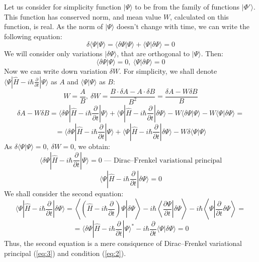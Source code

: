 \documentclass[a4paper,14pt]{extarticle}
\begin{document}
Let us consider for simplicity function $|\Psi\rangle$ to be from the family of functions $|\Phi'\rangle$. 
This function has conserved norm, and mean value $W$, calculated on this function, is real.
As the norm of $|\Psi\rangle$ doesn't change with time, we can write the following equation:
$$\delta\langle\Psi|\Psi\rangle = \langle\delta\Psi|\Psi\rangle+\langle\Psi|\delta\Psi\rangle=0$$
We will consider only variations $|\delta\Psi\rangle$, that are orthogonal to $|\Psi\rangle$. Then:
\begin{equation}
\langle\delta\Psi|\Psi\rangle=0,\ \langle\Psi|\delta\Psi\rangle=0
\label{eq:2}
\end{equation}
Now we can write down variation $\delta W$. 
For simplicity, we shall denote $\langle\Psi|\hat{H}-i\hbar\frac{\partial}{\partial t}|\Psi\rangle$ as $A$ 
and $\langle\Psi|\Psi\rangle$ as $B$:
$$W = \frac{A}{B},\ \delta W = \frac{B\cdot\delta A - A\cdot\delta B}{B^2}=\frac{\delta A - W\delta B}{B}$$
$$\delta A - W\delta B = \langle\delta\Psi|\hat{H}-i\hbar\frac{\partial}{\partial t}|\Psi\rangle + %
			 \langle\Psi|\hat{H}-i\hbar\frac{\partial}{\partial t}|\delta\Psi\rangle - 
			 W\langle\delta\Psi|\Psi\rangle - W\langle\Psi|\delta\Psi\rangle = $$
$$ = \langle\delta\Psi|\hat{H}-i\hbar\frac{\partial}{\partial t}|\Psi\rangle + %
     \langle\Psi|\hat{H}-i\hbar\frac{\partial}{\partial t}|\delta\Psi\rangle - W\delta\langle\Psi|\Psi\rangle$$
As $\delta\langle\Psi|\Psi\rangle=0,\ \delta W = 0$, we obtain:
\begin{equation}
\langle\delta\Psi|\hat{H}-i\hbar\frac{\partial}{\partial t}|\Psi\rangle = 0\text{ --- Dirac--Frenkel variational principal}
\label{eq:3}
\end{equation}
$$\langle\Psi|\hat{H}-i\hbar\frac{\partial}{\partial t}|\delta\Psi\rangle = 0$$
We shall consider the second equation:
$$\langle\Psi|\hat{H}-i\hbar\frac{\partial}{\partial t}|\delta\Psi\rangle = %
  \left\langle\left.\left(\hat{H}-i\hbar\frac{\partial}{\partial t}\right)\Psi\right|\delta\Psi\right\rangle-%
  i\hbar\left.\left\langle\frac{\partial\Psi}{\partial t}\right|\delta\Psi\right\rangle-%
  i\hbar\left\langle\Psi\left|\frac{\partial}{\partial t}\delta\Psi\right\rangle\right.=$$
$$=\langle\delta\Psi|\hat{H}-i\hbar\frac{\partial}{\partial t}|\Psi\rangle^* -%
   i\hbar\frac{\partial}{\partial t}\langle\Psi|\delta\Psi\rangle = 0$$
Thus, the second equation is a mere consiquence of Dirac--Frenkel variational principal (\ref{eq:3}) and condition (\ref{eq:2}).
\end{document}
